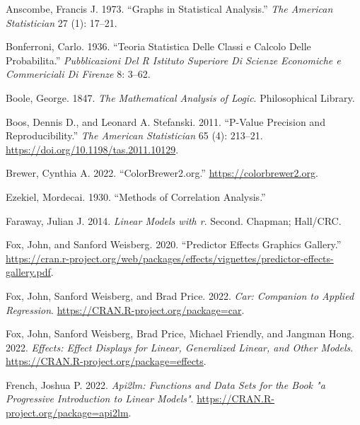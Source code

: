 \documentclass[
]{book}
\newlength{\cslhangindent}
\newlength{\cslentryspacingunit} %
\newenvironment{CSLReferences}[2] %
 {%
  \setlength{\parindent}{0pt}
  \ifodd #1
  \let\oldpar\par
  \def\par{\hangindent=\cslhangindent\oldpar}
  \fi
  \setlength{\parskip}{#2\cslentryspacingunit}
 }%
 {}
\theoremstyle{definition}
\theoremstyle{definition}
\theoremstyle{definition}
\theoremstyle{definition}
\theoremstyle{remark}
\begin{document}
\hypertarget{refs}{}
\begin{CSLReferences}{1}{0}
\leavevmode{}%
Anscombe, Francis J. 1973. {``Graphs in Statistical Analysis.''} \emph{The American Statistician} 27 (1): 17--21.

\leavevmode{}%
Bonferroni, Carlo. 1936. {``Teoria Statistica Delle Classi e Calcolo Delle Probabilita.''} \emph{Pubblicazioni Del R Istituto Superiore Di Scienze Economiche e Commericiali Di Firenze} 8: 3--62.

\leavevmode{}%
Boole, George. 1847. \emph{The Mathematical Analysis of Logic}. Philosophical Library.

\leavevmode{}%
Boos, Dennis D., and Leonard A. Stefanski. 2011. {``P-Value Precision and Reproducibility.''} \emph{The American Statistician} 65 (4): 213--21. \url{https://doi.org/10.1198/tas.2011.10129}.

\leavevmode{}%
Brewer, Cynthia A. 2022. {``ColorBrewer2.org.''} \url{https://colorbrewer2.org}.

\leavevmode{}%
Ezekiel, Mordecai. 1930. {``Methods of Correlation Analysis.''}

\leavevmode{}%
Faraway, Julian J. 2014. \emph{Linear Models with r}. Second. Chapman; Hall/CRC.

\leavevmode{}%
Fox, John, and Sanford Weisberg. 2020. {``Predictor Effects Graphics Gallery.''} \url{https://cran.r-project.org/web/packages/effects/vignettes/predictor-effects-gallery.pdf}.

\leavevmode{}%
Fox, John, Sanford Weisberg, and Brad Price. 2022. \emph{Car: Companion to Applied Regression}. \url{https://CRAN.R-project.org/package=car}.

\leavevmode{}%
Fox, John, Sanford Weisberg, Brad Price, Michael Friendly, and Jangman Hong. 2022. \emph{Effects: Effect Displays for Linear, Generalized Linear, and Other Models}. \url{https://CRAN.R-project.org/package=effects}.

\leavevmode{}%
French, Joshua P. 2022. \emph{Api2lm: Functions and Data Sets for the Book "a Progressive Introduction to Linear Models"}. \url{https://CRAN.R-project.org/package=api2lm}.


\end{CSLReferences}
\end{document}
